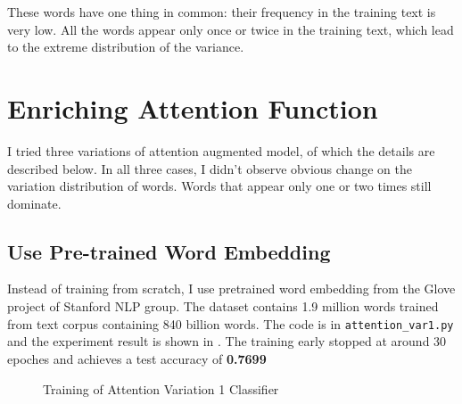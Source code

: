 \documentclass{article}
\begin{document}
These words have one thing in common: their frequency in the training text is very low. All the words appear only once or twice in the training text, which lead to the extreme distribution of the variance.
 

\section{Enriching Attention Function}
I tried three variations of attention augmented model, of which the details are described below. In all three cases, I didn't observe obvious change on the variation distribution of words. Words that appear only one or two times still dominate.
\subsection{Use Pre-trained Word Embedding}
Instead of training from scratch, I use pretrained word embedding from the Glove project of Stanford NLP group. The dataset contains 1.9 million words trained from text corpus containing 840 billion words. The code is in \texttt{attention\_var1.py} and the experiment result is shown in . The training early stopped at around 30 epoches and achieves a test accuracy of \textbf{0.7699}
\begin{figure}
\centering
{}
\caption{Training of Attention Variation 1 Classifier}
\label{fig:var1}
\end{figure}
\end{document}
